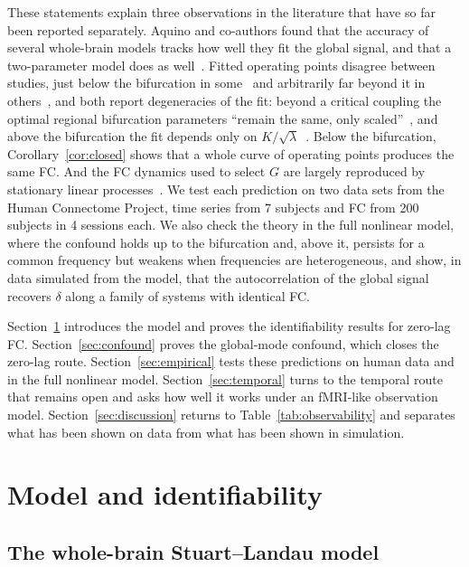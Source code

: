 \documentclass[aip,cha,reprint,amsmath,amssymb]{revtex4-2}
\theoremstyle{remark}
\begin{document}
These statements explain three observations in the literature that have so far been reported separately. Aquino and co-authors found that the accuracy of several whole-brain models tracks how well they fit the global signal, and that a two-parameter model does as well~\cite{Aquino2022}. Fitted operating points disagree between studies, just below the bifurcation in some~\cite{Deco2017dynamics} and arbitrarily far beyond it in others~\cite{Alexandersen2025}, and both report degeneracies of the fit: beyond a critical coupling the optimal regional bifurcation parameters ``remain the same, only scaled''~\cite{Deco2017dynamics}, and above the bifurcation the fit depends only on $K/\sqrt\lambda$~\cite{Alexandersen2025}. Below the bifurcation, Corollary~\ref{cor:closed} shows that a whole curve of operating points produces the same FC. And the FC dynamics used to select $G$ are largely reproduced by stationary linear processes~\cite{Liegeois2017}. We test each prediction on two data sets from the Human Connectome Project, time series from 7 subjects and FC from 200 subjects in 4 sessions each. We also check the theory in the full nonlinear model, where the confound holds up to the bifurcation and, above it, persists for a common frequency but weakens when frequencies are heterogeneous, and show, in data simulated from the model, that the autocorrelation of the global signal recovers $\delta$ along a family of systems with identical FC.

Section~\ref{sec:model} introduces the model and proves the identifiability results for zero-lag FC. Section~\ref{sec:confound} proves the global-mode confound, which closes the zero-lag route. Section~\ref{sec:empirical} tests these predictions on human data and in the full nonlinear model. Section~\ref{sec:temporal} turns to the temporal route that remains open and asks how well it works under an fMRI-like observation model. Section~\ref{sec:discussion} returns to Table~\ref{tab:observability} and separates what has been shown on data from what has been shown in simulation.

\section{Model and identifiability}\label{sec:model}

\subsection{The whole-brain Stuart--Landau model}
\end{document}
